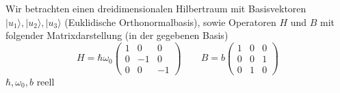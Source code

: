 \noindent
Wir betrachten einen dreidimensionalen Hilbertraum mit Basisvektoren $ |u_1\rangle, | u_2\rangle, | u_3 \rangle $ (Euklidische Orthonormalbasis), sowie Operatoren $ H $ und $ B $ mit folgender Matrixdarstellung (in der gegebenen Basis)
\begin{equation}
H = \hbar \omega_0 \begin{pmatrix}
1 & 0 & 0 \\ 0 & -1 & 0 \\ 0 & 0 & -1
\end{pmatrix} \qquad B = b \begin{pmatrix}
1 & 0 & 0 \\ 0 & 0 & 1 \\ 0 & 1 & 0
\end{pmatrix}
\label{2 34}
\end{equation}
$ \hbar, \omega_0, b $ reell
